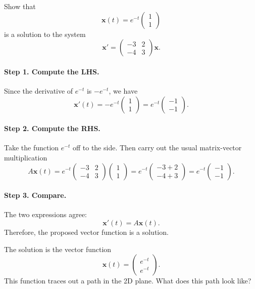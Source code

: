 \documentclass[11pt,letterpaper]{article}
\begin{document}
\begin{example}[2]{
Show that
\[
\mathbf{x}(t)=e^{-t}
\begin{pmatrix}1\\1\end{pmatrix}
\]
is a solution to the system
\[
\mathbf{x}'=
\begin{pmatrix}
-3&2\\-4&3
\end{pmatrix}\mathbf{x}.
\]
}
\paragraph{Step 1. Compute the LHS.} Since the derivative of $e^{-t}$ is $-e^{-t}$, we have
\[
\mathbf{x}'(t)
=-e^{-t}\begin{pmatrix}1\\1\end{pmatrix}
=e^{-t}\begin{pmatrix}-1\\-1\end{pmatrix}.
\]

\paragraph{Step 2. Compute the RHS.} Take the function $e^{-t}$ off to the side. Then carry out the usual matrix-vector multiplication
\[
A\mathbf{x}(t)
=e^{-t}
\begin{pmatrix}
-3&2\\-4&3
\end{pmatrix}
\begin{pmatrix}1\\1\end{pmatrix}
=e^{-t}
\begin{pmatrix}
-3+2\\-4+3
\end{pmatrix}
=e^{-t}
\begin{pmatrix}-1\\-1\end{pmatrix}.
\]

\paragraph{Step 3. Compare.}
The two expressions agree:
\[
\boxed{\mathbf{x}'(t)=A\mathbf{x}(t).}
\]
Therefore, the proposed vector function is a solution.
\end{example}

The solution is the vector function 
$$
    \textbf{x}(t) = \begin{pmatrix}
        e^{-t}\\
        e^{-t}
    \end{pmatrix}.
$$
This function traces out a path in the 2D plane. What does this path look like?
\end{document}
